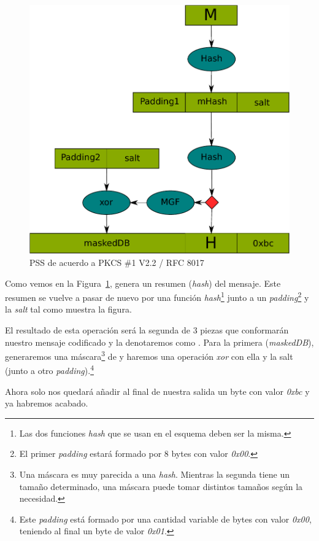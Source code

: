 \begin{figure}[ht]
  \centering
  \includegraphics[scale=0.6]{Figures/PSS}
  \decoRule
  \caption[PSS (Esquema)]{PSS de acuerdo a PKCS \#1 V2.2 / RFC 8017}
  \label{fig:PSS}
\end{figure}

Como vemos en la Figura~\ref{fig:PSS},  genera un resumen (\emph{hash}) del mensaje.
Este resumen se vuelve a pasar de nuevo por una función \emph{hash}\footnote{Las dos funciones \emph{hash} que se usan en el esquema deben ser la misma.}
junto a un \emph{padding}\footnote{El primer \emph{padding} estará formado por 8 bytes con valor \emph{0x00}.} y la \emph{salt} tal como muestra la figura.

El resultado de esta operación será la segunda de 3 piezas que conformarán nuestro mensaje codificado y la denotaremos como .
Para la primera (\emph{maskedDB}), generaremos una máscara\footnote{Una máscara es muy parecida a una \emph{hash}. Mientras la segunda tiene un tamaño determinado, una máscara puede tomar distintos tamaños según la necesidad.} de  y haremos una operación \emph{xor} con ella y la salt (junto a otro \emph{padding}).\footnote{Este \emph{padding} está formado por una cantidad variable de bytes con valor \emph{0x00}, teniendo al final un byte de valor \emph{0x01}.}

Ahora solo nos quedará añadir al final de nuestra salida un byte con valor \emph{0xbc} y ya habremos acabado. \emph{\parencite{Reference17}}

